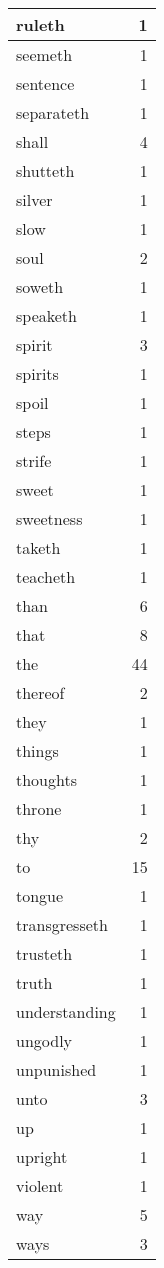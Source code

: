 \begin{center}
\begin{longtable}{l|r}
ruleth & 1\\ \hline 
seemeth & 1\\ \hline 
sentence & 1\\ \hline 
separateth & 1\\ \hline 
shall & 4\\ \hline 
shutteth & 1\\ \hline 
silver & 1\\ \hline 
slow & 1\\ \hline 
soul & 2\\ \hline 
soweth & 1\\ \hline 
speaketh & 1\\ \hline 
spirit & 3\\ \hline 
spirits & 1\\ \hline 
spoil & 1\\ \hline 
steps & 1\\ \hline 
strife & 1\\ \hline 
sweet & 1\\ \hline 
sweetness & 1\\ \hline 
taketh & 1\\ \hline 
teacheth & 1\\ \hline 
than & 6\\ \hline 
that & 8\\ \hline 
the & 44\\ \hline 
thereof & 2\\ \hline 
they & 1\\ \hline 
things & 1\\ \hline 
thoughts & 1\\ \hline 
throne & 1\\ \hline 
thy & 2\\ \hline 
to & 15\\ \hline 
tongue & 1\\ \hline 
transgresseth & 1\\ \hline 
trusteth & 1\\ \hline 
truth & 1\\ \hline 
understanding & 1\\ \hline 
ungodly & 1\\ \hline 
unpunished & 1\\ \hline 
unto & 3\\ \hline 
up & 1\\ \hline 
upright & 1\\ \hline 
violent & 1\\ \hline 
way & 5\\ \hline 
ways & 3\\ \hline 

\end{longtable}
\end{center}

